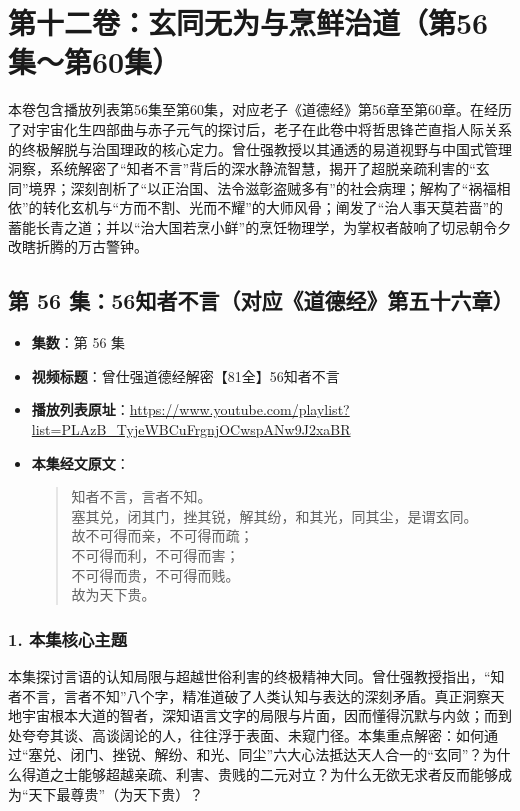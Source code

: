 \section*{第十二卷：玄同无为与烹鲜治道（第56集～第60集）}

本卷包含播放列表第56集至第60集，对应老子《道德经》第56章至第60章。在经历了对宇宙化生四部曲与赤子元气的探讨后，老子在此卷中将哲思锋芒直指人际关系的终极解脱与治国理政的核心定力。曾仕强教授以其通透的易道视野与中国式管理洞察，系统解密了“知者不言”背后的深水静流智慧，揭开了超脱亲疏利害的“玄同”境界；深刻剖析了“以正治国、法令滋彰盗贼多有”的社会病理；解构了“祸福相依”的转化玄机与“方而不割、光而不耀”的大师风骨；阐发了“治人事天莫若啬”的蓄能长青之道；并以“治大国若烹小鲜”的烹饪物理学，为掌权者敲响了切忌朝令夕改瞎折腾的万古警钟。

\clearpage

\subsection{第 56 集：56知者不言（对应《道德经》第五十六章）}
\label{sec:ep56}

\begin{itemize}
    \item \textbf{集数}：第 56 集
    \item \textbf{视频标题}：曾仕强道德经解密【81全】56知者不言
    \item \textbf{播放列表原址}：\url{https://www.youtube.com/playlist?list=PLAzB_TyjeWBCuFrgnjOCwspANw9J2xaBR}
    \item \textbf{本集经文原文}：
    \begin{quote}\kaishu
    知者不言，言者不知。\\
    塞其兑，闭其门，挫其锐，解其纷，和其光，同其尘，是谓玄同。\\
    故不可得而亲，不可得而疏；\\
    不可得而利，不可得而害；\\
    不可得而贵，不可得而贱。\\
    故为天下贵。
    \end{quote}
\end{itemize}

\subsubsection{1. 本集核心主题}
本集探讨言语的认知局限与超越世俗利害的终极精神大同。曾仕强教授指出，“知者不言，言者不知”八个字，精准道破了人类认知与表达的深刻矛盾。真正洞察天地宇宙根本大道的智者，深知语言文字的局限与片面，因而懂得沉默与内敛；而到处夸夸其谈、高谈阔论的人，往往浮于表面、未窥门径。本集重点解密：如何通过“塞兑、闭门、挫锐、解纷、和光、同尘”六大心法抵达天人合一的“玄同”？为什么得道之士能够超越亲疏、利害、贵贱的二元对立？为什么无欲无求者反而能够成为“天下最尊贵”（为天下贵）？

